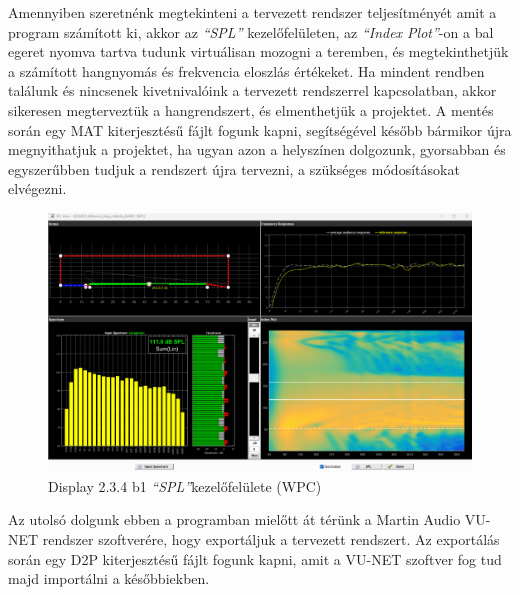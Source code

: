 Amennyiben szeretnénk megtekinteni a tervezett rendszer teljesítményét amit a program számított ki, 
akkor az \textit{``SPL''} kezelőfelületen, az \textit{``Index Plot''}-on a bal egeret nyomva tartva
tudunk virtuálisan mozogni a teremben, és megtekinthetjük a számított hangnyomás és frekvencia eloszlás értékeket.
Ha mindent rendben találunk és nincsenek kivetnivalóink a tervezett rendszerrel kapcsolatban, akkor
sikeresen megterveztük a hangrendszert, és elmenthetjük a projektet.
A mentés során egy MAT kiterjesztésű fájlt fogunk kapni, segítségével később bármikor újra megnyithatjuk a projektet,
ha ugyan azon a helyszínen dolgozunk, gyorsabban és egyszerűbben tudjuk a rendszert újra tervezni, a szükséges
módosításokat elvégezni.
\begin{figure}[H]
	\centering
	\includegraphics[width=\textwidth, keepaspectratio]{figures/display_wpc_6.png}
	\caption{Display 2.3.4 b1 \textit{``SPL''}kezelőfelülete (WPC)}\label{fig:display_wpc_6}
\end{figure}
Az utolsó dolgunk ebben a programban mielőtt át térünk a Martin Audio VU-NET rendszer szoftverére, hogy exportáljuk a tervezett rendszert.
Az exportálás során egy D2P kiterjesztésű fájlt fogunk kapni, amit a VU-NET szoftver fog tud majd importálni a későbbiekben.
